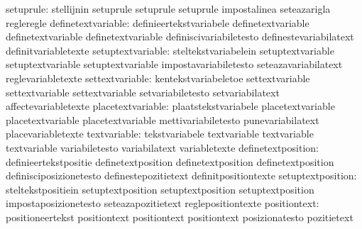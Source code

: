                        setuprule: stellijnin                       setuprule
                                  setuprule                        setuprule
                                  impostalinea                     seteazarigla
                                  regleregle
              definetextvariable: definieertekstvariabele          definetextvariable
                                  definetextvariable               definetextvariable
                                  definiscivariabiletesto          definestevariabilatext
                                  definitvariabletexte
               setuptextvariable: steltekstvariabelein             setuptextvariable
                                  setuptextvariable                setuptextvariable
                                  impostavariabiletesto            seteazavariabilatext
                                  reglevariabletexte
                 settextvariable: kentekstvariabeletoe             settextvariable
                                  settextvariable                  settextvariable
                                  setvariabiletesto                setvariabilatext
                                  affectevariabletexte
               placetextvariable: plaatstekstvariabele             placetextvariable
                                  placetextvariable                placetextvariable
                                  mettivariabiletesto              punevariabilatext
                                  placevariabletexte
                    textvariable: tekstvariabele                   textvariable
                                  textvariable                     textvariable
                                  variabiletesto                   variabilatext
                                  variabletexte
              definetextposition: definieertekstpositie            definetextposition
                                  definetextposition               definetextposition
                                  definisciposizionetesto          definestepozitietext
                                  definitpositiontexte
               setuptextposition: steltekstpositiein               setuptextposition
                                  setuptextposition                setuptextposition
                                  impostaposizionetesto            seteazapozitietext
                                  reglepositiontexte
                    positiontext: positioneertekst                 positiontext
                                  positiontext                     positiontext
                                  posizionatesto                   pozitietext
